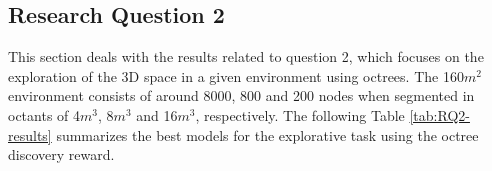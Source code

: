 
\subsection{Research Question 2}\label{chap:4:results-RQ2}

This section deals with the results related to question 2, which focuses on the exploration of the 3D space in a given environment using octrees. The 160$m^2$ environment consists of around 8000, 800 and 200 nodes when segmented in octants of 4$m^3$, 8$m^3$ and 16$m^3$, respectively. The following Table \ref{tab:RQ2-results} summarizes the best models for the explorative task using the octree discovery reward.

